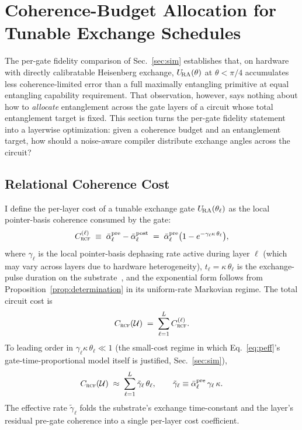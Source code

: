 
\section{Coherence-Budget Allocation for Tunable Exchange Schedules}
\label{sec:alloc}

The per-gate fidelity comparison of Sec.~\ref{sec:sim} establishes
that, on hardware with directly calibratable Heisenberg exchange,
$U_{\!\mathrm{RA}}(\theta)$ at $\theta < \pi/4$ accumulates less coherence-limited
error than a full maximally entangling primitive at equal entangling
capability requirement.
That observation, however, says nothing about how to \emph{allocate}
entanglement across the gate layers of a circuit whose total
entanglement target is fixed.
This section turns the per-gate fidelity statement into a layerwise
optimization: given a coherence budget and an entanglement target,
how should a noise-aware compiler distribute exchange angles across
the circuit?

\subsection{Relational Coherence Cost}
\label{subsec:cost}

I define the per-layer cost of a tunable exchange gate
$U_{\!\mathrm{RA}}(\theta_\ell)$ as the local pointer-basis coherence consumed by
the gate:
%
\begin{equation}
\label{eq:layer-cost}
C_{\textsc{rcf}}^{(\ell)} \;\equiv\; \bar\alpha_\ell^{\rm pre} - \bar\alpha_\ell^{\rm post}
\;=\; \bar\alpha_\ell^{\rm pre}\bigl(1 - e^{-\gamma_\ell \kappa\, \theta_\ell}\bigr),
\end{equation}
%
where $\gamma_\ell$ is the local pointer-basis dephasing rate active
during layer $\ell$ (which may vary across layers due to hardware
heterogeneity), $t_\ell = \kappa\, \theta_\ell$ is the exchange-pulse
duration on the substrate~\cite{Krantz2019}, and the exponential
form follows from
Proposition~\ref{prop:determination} in its uniform-rate Markovian
regime.
The total circuit cost is
%
\begin{equation}
\label{eq:circuit-cost}
C_{\textsc{rcf}}(\mathcal{U}) \;=\; \sum_{\ell=1}^{L} C_{\textsc{rcf}}^{(\ell)}.
\end{equation}
%
To leading order in $\gamma_\ell \kappa\, \theta_\ell \ll 1$
(the small-cost regime in which Eq.~\eqref{eq:peff}'s
gate-time-proportional model itself is justified, Sec.~\ref{sec:sim}),
%
\begin{equation}
\label{eq:linear-cost}
C_{\textsc{rcf}}(\mathcal{U}) \;\approx\;
  \sum_{\ell=1}^{L} \tilde\gamma_\ell\, \theta_\ell,
  \qquad \tilde\gamma_\ell \equiv \bar\alpha_\ell^{\rm pre}\, \gamma_\ell\, \kappa.
\end{equation}
%
The effective rate $\tilde\gamma_\ell$ folds the substrate's exchange
time-constant and the layer's residual pre-gate coherence into a
single per-layer cost coefficient.

